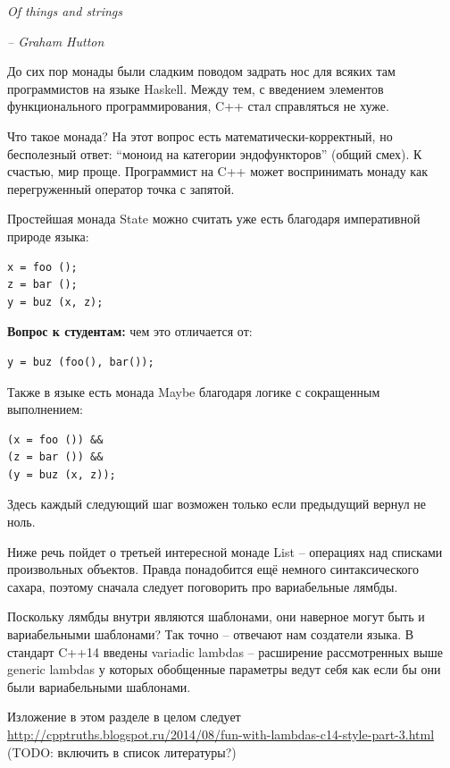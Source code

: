 \documentclass[a4paper,12pt,oneside]{book}
\newif\ifanswers
\begin{document}
\hfill\textit{Of things and strings}{\vspace{0.5em}}

\hfill\textit{-- Graham Hutton}

До сих пор монады были сладким поводом задрать нос для всяких там программистов на языке Haskell. Между тем, с введением элементов функционального программирования, C++ стал справляться не хуже.

Что такое монада? На этот вопрос есть математически-корректный, но бесполезный ответ: ``моноид на категории эндофункторов'' (общий смех). К счастью, мир проще. Программист на C++ может воспринимать монаду как перегруженный оператор точка с запятой.

Простейшая монада State можно считать уже есть благодаря императивной природе языка:

\begin{lstlisting}
x = foo ();
z = bar ();
y = buz (x, z);
\end{lstlisting}

\textbf{Вопрос к студентам:} чем это отличается от:

\begin{lstlisting}
y = buz (foo(), bar());
\end{lstlisting}

\ifanswers
Правильный ответ: задана последовательность выполнения функций \lstinline!foo! и \lstinline!bar! 
\fi

Также в языке есть монада Maybe благодаря логике с сокращенным выполнением:

\begin{lstlisting}
(x = foo ()) &&
(z = bar ()) &&
(y = buz (x, z));
\end{lstlisting}

Здесь каждый следующий шаг возможен только если предыдущий вернул не ноль.

Ниже речь пойдет о третьей интересной монаде List -- операциях над списками произвольных объектов. Правда понадобится ещё немного синтаксического сахара, поэтому сначала следует поговорить про вариабельные лямбды.

Поскольку лямбды внутри являются шаблонами, они наверное могут быть и вариабельными шаблонами? Так точно -- отвечают нам создатели языка. В стандарт C++14 введены variadic lambdas -- расширение рассмотренных выше generic lambdas у которых обобщенные параметры ведут себя как если бы они были вариабельными шаблонами.

Изложение в этом разделе в целом следует \url{http://cpptruths.blogspot.ru/2014/08/fun-with-lambdas-c14-style-part-3.html} (TODO: включить в список литературы?)
\end{document}
